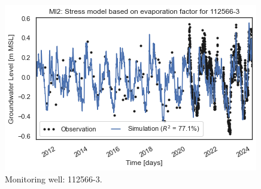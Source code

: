 \begin{figure}[htbp]
\begin{minipage}{0.32\textwidth}
        \includegraphics[width=\linewidth]{frontmatter/Rozenburg-fig/1125663.png}
        \caption{Monitoring well: 112566-3.}
        \label{fig:112566-3}
    \end{minipage}
\end{figure}

